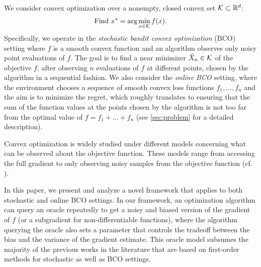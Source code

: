 We consider convex optimization over a nonempty, closed convex set $\mathcal{K} \subset \mathbb{R}^d$:
\begin{align}
\mbox{Find } x^* = \arg\min_{x \in \mathcal{K}} f(x). \label{eq:pb}
\end{align}
Specifically, we operate in the \textit{stochastic bandit convex optimization} (BCO) setting where $f$ is a smooth convex function and an algorithm observes only noisy point evaluations of $f$. The goal is to find a near minimizer $\hat X_n \in \mathcal{K}$ of the objective $f$, after observing $n$ evaluations of $f$ at different points, chosen by the algorithm in a sequential fashion.
We also consider the \textit{online BCO} setting, where the environment chooses a sequence of smooth convex loss functions $f_1,\dots,f_n$ and the aim is to minimize the regret, which roughly translates to ensuring
 that the sum of the function values at the points chosen by the algorithm is not too far from the optimal value of $f = f_1+\dots+f_n$  (see \cref{sec:problem} for a detailed description).

Convex optimization is widely studied under different models concerning what can be observed about the objective function. 
These models range from accessing the full gradient to only observing noisy samples from the objective function (cf. \citealp{nesterov2004introductory,DeGliNe14,HaLe14:SOC,PoTsy90,flaxman2005online,AbHaRa08,AgDeXi10,Ne11:TR,AgFoHsuKaRa13:SIAM,katkul,kushcla,spall1992multivariate,spall1997one,Dip03:AoS,bhatnagar-book,duchi2015optimal}). 

In this paper, 
we present and analyze a novel framework that applies to both stochastic and online BCO settings. 
In our framework, an optimization algorithm can query an oracle repeatedly to get a noisy and biased version of the gradient of $f$ (or a subgradient for non-differentiable functions), where the algorithm querying the oracle also sets a parameter that controls the tradeoff between the bias and the variance of the gradient estimate.
This oracle model subsumes the majority of the previous works in the literature that are based on first-order methods for stochastic as well as BCO settings.


